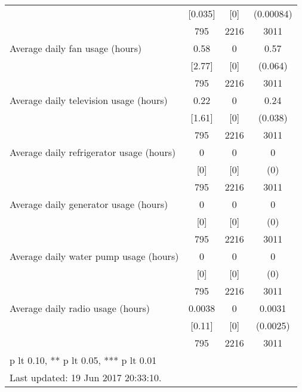 \begin{table}[htbp]
\begin{tabular*}{0.9\hsize}{@{\hskip\tabcolsep\extracolsep\fill}l*{1}{ccc}}
                                &  [0.035]&      [0]&(0.00084)         \\
                                &      795&     2216&     3011         \\
Average daily fan usage (hours) &     0.58&        0&     0.57\sym{***}\\
                                &   [2.77]&      [0]&  (0.064)         \\
                                &      795&     2216&     3011         \\
Average daily television usage (hours)&     0.22&        0&     0.24\sym{***}\\
                                &   [1.61]&      [0]&  (0.038)         \\
                                &      795&     2216&     3011         \\
Average daily refrigerator usage (hours)&        0&        0&        0         \\
                                &      [0]&      [0]&      (0)         \\
                                &      795&     2216&     3011         \\
Average daily generator usage (hours)&        0&        0&        0         \\
                                &      [0]&      [0]&      (0)         \\
                                &      795&     2216&     3011         \\
Average daily water pump usage (hours)&        0&        0&        0         \\
                                &      [0]&      [0]&      (0)         \\
                                &      795&     2216&     3011         \\
Average daily radio usage (hours)&   0.0038&        0&   0.0031         \\
                                &   [0.11]&      [0]& (0.0025)         \\
                                &      795&     2216&     3011         \\
\bottomrule
\multicolumn{4}{l}{\footnotesize * p lt 0.10, ** p lt 0.05, *** p lt 0.01}\\
\multicolumn{4}{l}{\footnotesize Last updated: 19 Jun 2017 20:33:10.}\\
\end{tabular*}
\end{table}
